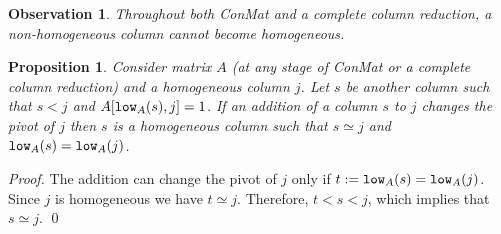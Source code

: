 \documentclass[a4paper,english,cleveref]{article}
\theoremstyle{plain}
\newtheorem{prop}{Proposition}[section]
\newtheorem{observation}{Observation}[section]
\newcounter{li}
\newcommand{\low}{{\tt low}}
\begin{document}
\begin{observation}\label{obs:non-homogeneous-columns}
    Throughout both {\sc ConMat} and a complete column reduction, a non-homogeneous column cannot become homogeneous.
\end{observation}


\begin{prop}\label{prop:homogeneity_loss}
    Consider matrix $A$ (at any stage of {\sc ConMat} or a complete column reduction) and a homogeneous column $j$.
    Let $s$ be another column such that $s<j$ and $A[\low_A(s),j]=1$.
    If an addition of a column $s$ to $j$ changes the pivot of $j$ 
    then $s$ is a homogeneous column such that $s\simeq j$ and $\low_A(s)=\low_A(j)$.
\end{prop}
\begin{proof}
    The addition can change the pivot of $j$ only if $t:=\low_A(s)=\low_A(j)$.
    Since $j$ is homogeneous we have $t\simeq j$.
    Therefore, $t < s <j$, which implies that $s\simeq j$.
    \qed
\end{proof}
\end{document}
